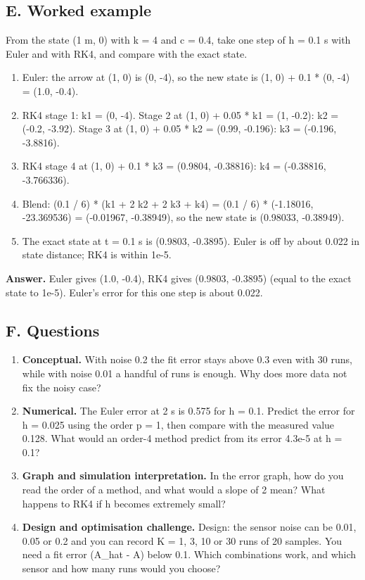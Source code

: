 \documentclass[11pt,a4paper]{article}
\begin{document}
\subsection*{E. Worked example}
From the state (1 m, 0) with k = 4 and c = 0.4, take one step of h = 0.1 s with Euler and with RK4, and compare with the exact state.
\begin{enumerate}[nosep]
\item Euler: the arrow at (1, 0) is (0, -4), so the new state is (1, 0) + 0.1 * (0, -4) = (1.0, -0.4).
\item RK4 stage 1: k1 = (0, -4). Stage 2 at (1, 0) + 0.05 * k1 = (1, -0.2): k2 = (-0.2, -3.92). Stage 3 at (1, 0) + 0.05 * k2 = (0.99, -0.196): k3 = (-0.196, -3.8816).
\item RK4 stage 4 at (1, 0) + 0.1 * k3 = (0.9804, -0.38816): k4 = (-0.38816, -3.766336).
\item Blend: (0.1 / 6) * (k1 + 2 k2 + 2 k3 + k4) = (0.1 / 6) * (-1.18016, -23.369536) = (-0.01967, -0.38949), so the new state is (0.98033, -0.38949).
\item The exact state at t = 0.1 s is (0.9803, -0.3895). Euler is off by about 0.022 in state distance; RK4 is within 1e-5.
\end{enumerate}
\textbf{Answer.} Euler gives (1.0, -0.4), RK4 gives (0.9803, -0.3895) (equal to the exact state to 1e-5). Euler's error for this one step is about 0.022.

\subsection*{F. Questions}
\begin{enumerate}[nosep]
\item \textbf{Conceptual.} With noise 0.2 the fit error stays above 0.3 even with 30 runs, while with noise 0.01 a handful of runs is enough. Why does more data not fix the noisy case?
\item \textbf{Numerical.} The Euler error at 2 s is 0.575 for h = 0.1. Predict the error for h = 0.025 using the order p = 1, then compare with the measured value 0.128. What would an order-4 method predict from its error 4.3e-5 at h = 0.1?
\item \textbf{Graph and simulation interpretation.} In the error graph, how do you read the order of a method, and what would a slope of 2 mean? What happens to RK4 if h becomes extremely small?
\item \textbf{Design and optimisation challenge.} Design: the sensor noise can be 0.01, 0.05 or 0.2 and you can record K = 1, 3, 10 or 30 runs of 20 samples. You need a fit error (\textbar{}A\_hat - A\textbar{}) below 0.1. Which combinations work, and which sensor and how many runs would you choose?
\end{enumerate}
\end{document}
